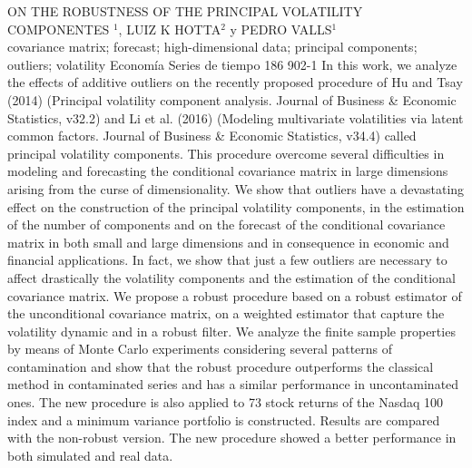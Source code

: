\A
{ON THE ROBUSTNESS OF THE PRINCIPAL VOLATILITY COMPONENTES}
{$^1$, LUIZ K HOTTA$^2$ y PEDRO VALLS$^1$}
{
\\}
{covariance matrix; forecast; high-dimensional data; principal components; outliers; volatility} 
 {Economía} 
 {Series de tiempo} 
 {186} 
 {902-1}
{In this work, we analyze the effects of additive outliers on the recently proposed procedure of Hu and Tsay (2014) (Principal volatility component analysis. Journal of Business \& Economic Statistics, v32.2) and Li et al. (2016) (Modeling multivariate volatilities via latent common factors. Journal of Business \& Economic Statistics, v34.4) called principal volatility components. This procedure overcome several difficulties in modeling and forecasting the conditional covariance matrix in large dimensions arising from the curse of dimensionality. We show that outliers have a devastating effect on the construction of the principal volatility components, in the estimation of the number of components and on the forecast of the conditional covariance matrix in both small and large dimensions and in consequence in economic and financial applications. In fact, we show that just a few outliers are necessary to affect drastically the volatility components and the estimation of the conditional covariance matrix. We propose a robust procedure based on a robust estimator of the unconditional covariance matrix, on a weighted estimator that capture the volatility dynamic and in a robust filter. We analyze the finite sample properties by means of Monte Carlo experiments considering several patterns of contamination and show that the robust procedure outperforms the classical method in contaminated series and has a similar performance in uncontaminated ones. The new procedure is also applied to 73 stock returns of the Nasdaq 100 index and a minimum variance portfolio is constructed. Results are compared with the non-robust version. The new procedure showed a better performance in both simulated and real data.}
